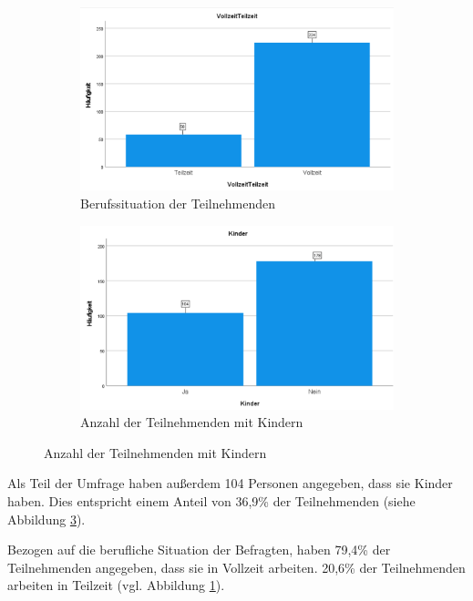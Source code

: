 \begin{figure}[h]
    \begin{subfigure}{0.49\textwidth}
        \centering
        \includegraphics[width=\textwidth]{04_Artefakte/01_Abbildungen/deskriptiv_teilzeit_vollzeit.png}
        \caption{Berufssituation der Teilnehmenden}
        \label{fig:berufssituation}
    \end{subfigure}
    \begin{subfigure}{0.49\textwidth}
        \centering
        \includegraphics[width=\textwidth]{04_Artefakte/01_Abbildungen/deskriptiv_kinder.png}
        \caption{Anzahl der Teilnehmenden mit Kindern}
        \label{fig:kinder}        
    \end{subfigure}
\end{figure}

Als Teil der Umfrage haben außerdem 104 Personen angegeben, dass sie Kinder haben. Dies entspricht einem Anteil von 36,9\% der 
Teilnehmenden (siehe Abbildung \ref{fig:kinder}).

Bezogen auf die berufliche Situation der Befragten, haben 79,4\% der Teilnehmenden angegeben, dass sie in 
Vollzeit arbeiten. 20,6\% der Teilnehmenden arbeiten in Teilzeit (vgl. Abbildung \ref{fig:berufssituation}).


